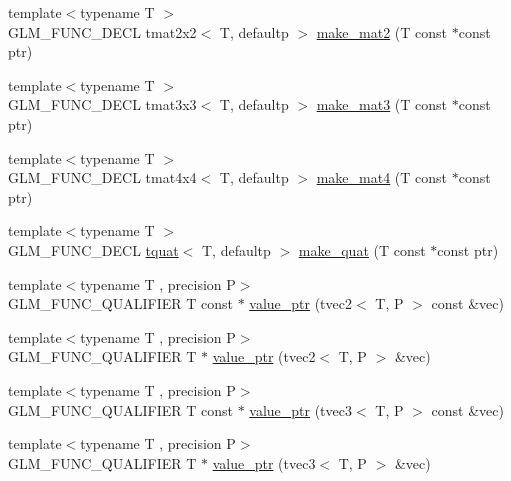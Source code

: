 \begin{DoxyCompactItemize}
\item 
{\footnotesize template$<$typename T $>$ }\\G\+L\+M\+\_\+\+F\+U\+N\+C\+\_\+\+D\+E\+C\+L tmat2x2$<$ T, defaultp $>$ \hyperlink{group__gtc__type__ptr_ga52a16e333fef7e33ca740779482a8693}{make\+\_\+mat2} (T const $\ast$const ptr)
\item 
{\footnotesize template$<$typename T $>$ }\\G\+L\+M\+\_\+\+F\+U\+N\+C\+\_\+\+D\+E\+C\+L tmat3x3$<$ T, defaultp $>$ \hyperlink{group__gtc__type__ptr_gac2bc10c519ffc8db9e24f325f23787ea}{make\+\_\+mat3} (T const $\ast$const ptr)
\item 
{\footnotesize template$<$typename T $>$ }\\G\+L\+M\+\_\+\+F\+U\+N\+C\+\_\+\+D\+E\+C\+L tmat4x4$<$ T, defaultp $>$ \hyperlink{group__gtc__type__ptr_ga2c6e6d457cb932e1ce683e4f690a6f60}{make\+\_\+mat4} (T const $\ast$const ptr)
\item 
{\footnotesize template$<$typename T $>$ }\\G\+L\+M\+\_\+\+F\+U\+N\+C\+\_\+\+D\+E\+C\+L \hyperlink{structglm_1_1tquat}{tquat}$<$ T, defaultp $>$ \hyperlink{group__gtc__type__ptr_gaadafb6600af2633e4c98cc64c72f5269}{make\+\_\+quat} (T const $\ast$const ptr)
\item 
{\footnotesize template$<$typename T , precision P$>$ }\\G\+L\+M\+\_\+\+F\+U\+N\+C\+\_\+\+Q\+U\+A\+L\+I\+F\+I\+E\+R T const $\ast$ \hyperlink{group__gtc__type__ptr_gafb01331238d8899dde700cb9b5dc6ef3}{value\+\_\+ptr} (tvec2$<$ T, P $>$ const \&vec)
\item 
{\footnotesize template$<$typename T , precision P$>$ }\\G\+L\+M\+\_\+\+F\+U\+N\+C\+\_\+\+Q\+U\+A\+L\+I\+F\+I\+E\+R T $\ast$ \hyperlink{group__gtc__type__ptr_gabd3cc713184a2093862605f5f0abb8a4}{value\+\_\+ptr} (tvec2$<$ T, P $>$ \&vec)
\item 
{\footnotesize template$<$typename T , precision P$>$ }\\G\+L\+M\+\_\+\+F\+U\+N\+C\+\_\+\+Q\+U\+A\+L\+I\+F\+I\+E\+R T const $\ast$ \hyperlink{group__gtc__type__ptr_gac04db5d9c05bd3d50140f34f8695a08c}{value\+\_\+ptr} (tvec3$<$ T, P $>$ const \&vec)
\item 
{\footnotesize template$<$typename T , precision P$>$ }\\G\+L\+M\+\_\+\+F\+U\+N\+C\+\_\+\+Q\+U\+A\+L\+I\+F\+I\+E\+R T $\ast$ \hyperlink{group__gtc__type__ptr_gab2832ef9f1d2571fab5c7ae661e11e75}{value\+\_\+ptr} (tvec3$<$ T, P $>$ \&vec)
\item 

\end{DoxyCompactItemize}
